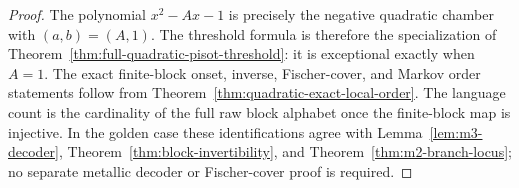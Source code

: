 \begin{proof}
The polynomial $x^2-Ax-1$ is precisely the negative quadratic chamber with
$(a,b)=(A,1)$.  The threshold formula is therefore the specialization of
Theorem~\ref{thm:full-quadratic-pisot-threshold}: it is exceptional exactly
when $A=1$.  The exact finite-block onset, inverse, Fischer-cover, and Markov
order statements follow from
Theorem~\ref{thm:quadratic-exact-local-order}.  The language count is the
cardinality of the full raw block alphabet once the finite-block map is
injective.  In the golden case these identifications agree with
Lemma~\ref{lem:m3-decoder}, Theorem~\ref{thm:block-invertibility}, and
Theorem~\ref{thm:m2-branch-locus}; no separate metallic decoder or
Fischer-cover proof is required.
\end{proof}

